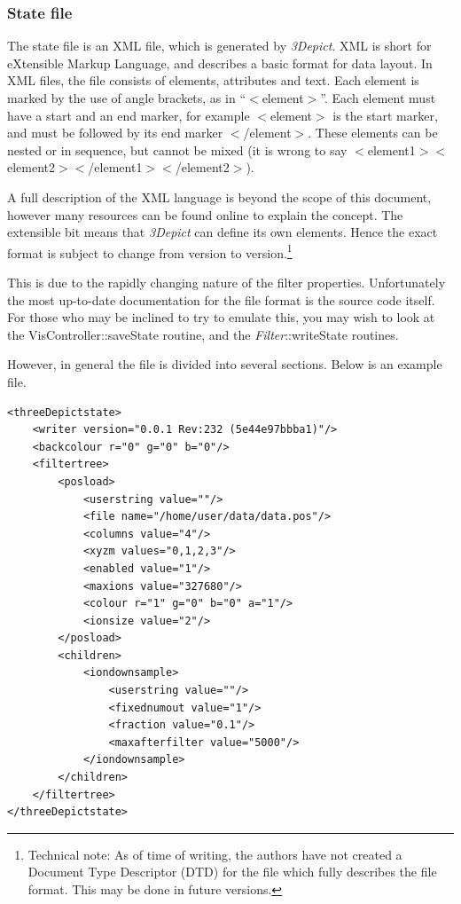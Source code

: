 \documentclass[10pt]{article}
\begin{document}
\subsubsection{State file}
\label{sec:xmlstatefile}
The state file is an XML file, which is generated by \emph{3Depict}. XML is short for eXtensible Markup Language, and describes  a basic format for data layout. In XML files, the file consists of elements, attributes and text. Each element is marked by the use of angle brackets, as in ``$<$element$>$''. Each element must have a start and an end marker, for example $<$element$>$ is the start marker, and must be followed by its end marker $<$/element$>$. These elements can be nested or in sequence, but cannot be mixed (it is wrong to say $<$element1$>$$<$element2$>$$<$/element1$>$$<$/element2$>$). 

A full description of the XML language is beyond the scope of this document, however many resources can be found online to explain the concept. The extensible bit means that \emph{3Depict} can define its own elements. Hence the exact format is subject to change from version to version.\footnote{Technical note: As of time of writing, the authors have not created a Document Type Descriptor (DTD) for the file which fully describes the file format. This may be done in future versions.}

This is due to the rapidly changing nature of the filter properties. Unfortunately the most up-to-date documentation for the file format is the source code itself. For those who may be inclined to try to emulate this, you may wish to look at the VisController::saveState routine, and the \emph{Filter}::writeState routines.

However, in general the file is divided into several sections. Below is an example file.
\begin{verbatim}
<threeDepictstate>
    <writer version="0.0.1 Rev:232 (5e44e97bbba1)"/>
    <backcolour r="0" g="0" b="0"/>
    <filtertree>
        <posload>
            <userstring value=""/>
            <file name="/home/user/data/data.pos"/>
            <columns value="4"/>
            <xyzm values="0,1,2,3"/>
            <enabled value="1"/>
            <maxions value="327680"/>
            <colour r="1" g="0" b="0" a="1"/>
            <ionsize value="2"/>
        </posload>
        <children>
            <iondownsample>
                <userstring value=""/>
                <fixednumout value="1"/>
                <fraction value="0.1"/>
                <maxafterfilter value="5000"/>
            </iondownsample>
        </children>
    </filtertree>
</threeDepictstate>
\end{verbatim}
\end{document}
